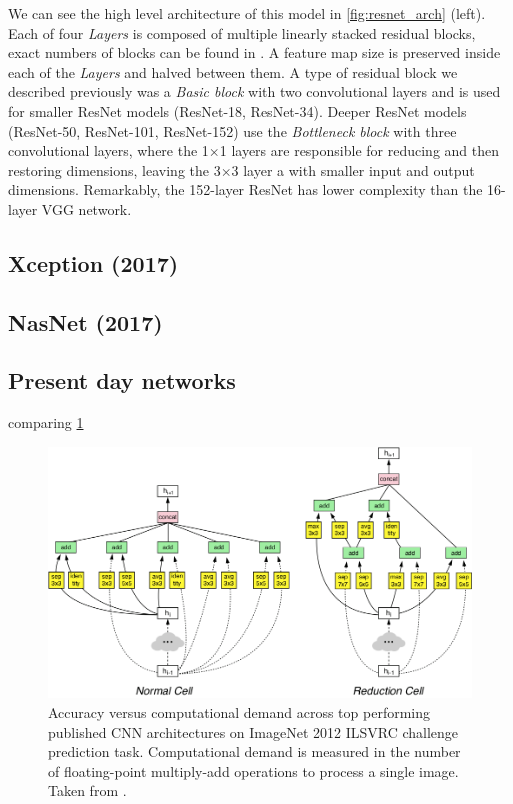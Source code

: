 We can see the high level architecture of this model in \cref{fig:resnet_arch} (left). Each of four \textit{Layers} is composed of multiple linearly stacked residual blocks, exact numbers of blocks can be found in \cite[table 1]{bib:resnet}. A feature map size is preserved inside each of the \textit{Layers} and halved between them. A type of residual block we described previously was a \textit{Basic block} with two convolutional layers and is used for smaller ResNet models (ResNet-18, ResNet-34). Deeper ResNet models (ResNet-50, ResNet-101, ResNet-152) use the \textit{Bottleneck block} with three convolutional layers, where the 1$\times$1 layers are responsible for reducing and then restoring dimensions, leaving the 3$\times$3 layer a with smaller input and output dimensions. Remarkably, the 152-layer ResNet has lower complexity than the 16-layer VGG network.



\subsection*{Xception (2017)}
\label{sec:xception}

\subsection*{NasNet (2017)}
\label{sec:nasnet}

\subsection*{Present day networks}
 comparing \cref{fig:cnncomp}

\begin{figure}
    \includegraphics[width=\textwidth]{img/nasnet}
    \caption{Accuracy versus computational demand across top performing published CNN architectures on ImageNet 2012 ILSVRC challenge prediction task. Computational demand is measured in the number of floating-point multiply-add operations to process a single image. Taken from \cite{bib:nasnet}.}
    \label{fig:cnncomp}
\end{figure}

